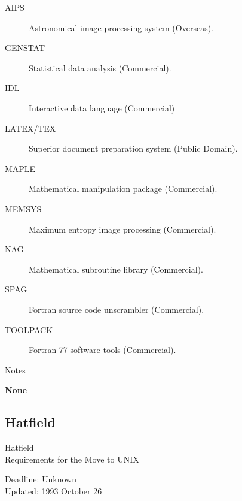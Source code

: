 \begin{description}
\item[AIPS] Astronomical image processing system (Overseas).
\item[GENSTAT] Statistical data analysis (Commercial).
\item[IDL] Interactive data language (Commercial)
\item[LATEX/TEX] Superior document preparation system (Public Domain).
\item[MAPLE] Mathematical manipulation package (Commercial).
\item[MEMSYS] Maximum entropy image processing (Commercial).
\item[NAG] Mathematical subroutine library (Commercial).
\item[SPAG] Fortran source code unscrambler (Commercial).
\item[TOOLPACK] Fortran 77 software tools (Commercial).
\end{description}


\vspace{5mm}
\begin{center}
{\large\sc Notes}
\end{center}

{\bf None}


\newpage
\subsection{Hatfield}

\renewcommand{\starsitename}{Hatfield}
\renewcommand{\starnodename}{HATVAD}

\renewcommand{\starunixdate}{Unknown}
\renewcommand{\starupdate}{1993 October 26}

\renewcommand{\starsitetelephone}{0707 279607}
\renewcommand{\starsitefax}{0707284514}

\begin{center}
{\Large\sc \starsitename \\ [2ex]
           Requirements for the Move to UNIX}

\vspace{3mm}
{\large\sc Deadline: \starunixdate \\ [1ex]
           Updated: \starupdate}
\end{center}

\vspace{5mm}

